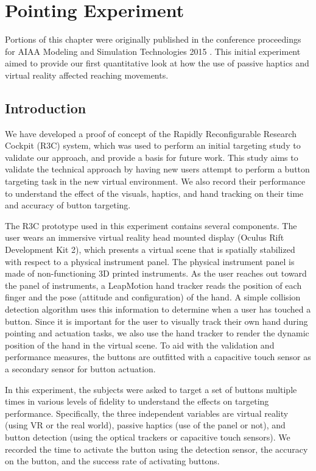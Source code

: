 \chapter{Pointing Experiment}
\label{chap:pointing}

Portions of this chapter were originally published in the conference proceedings for AIAA Modeling and Simulation Technologies 2015 \citep{joyce_rapidly_2015}.
This initial experiment aimed to provide our first quantitative look at how the use of passive haptics and virtual reality affected reaching movements.

\section{Introduction}

We have developed a proof of concept of the Rapidly Reconfigurable Research Cockpit (R3C) system, which was used to perform an initial targeting study to validate our approach, and provide a basis for future work.
This study aims to validate the technical approach by having new users attempt to perform a button targeting task in the new virtual environment.
We also record their performance to understand the effect of the visuals, haptics, and hand tracking on their time and accuracy of button targeting.

The R3C prototype used in this experiment contains several components.
The user wears an immersive virtual reality head mounted display (Oculus Rift Development Kit 2), which presents a virtual scene that is spatially stabilized with respect to a physical instrument panel.
The physical instrument panel is made of non-functioning 3D printed instruments.
As the user reaches out toward the panel of instruments, a LeapMotion hand tracker reads the position of each finger and the pose (attitude and configuration) of the hand.
A simple collision detection algorithm uses this information to determine when a user has touched a button.
Since it is important for the user to visually track their own hand during pointing and actuation tasks, we also use the hand tracker to render the dynamic position of the hand in the virtual scene.
To aid with the validation and performance measures, the buttons are outfitted with a capacitive touch sensor as a secondary sensor for button actuation.

In this experiment, the subjects were asked to target a set of buttons multiple times in various levels of fidelity to understand the effects on targeting performance.
Specifically, the three independent variables are virtual reality (using VR or the real world), passive haptics (use of the panel or not), and button detection (using the optical trackers or capacitive touch sensors).
We recorded the time to activate the button using the detection sensor, the accuracy on the button, and the success rate of activating buttons.


